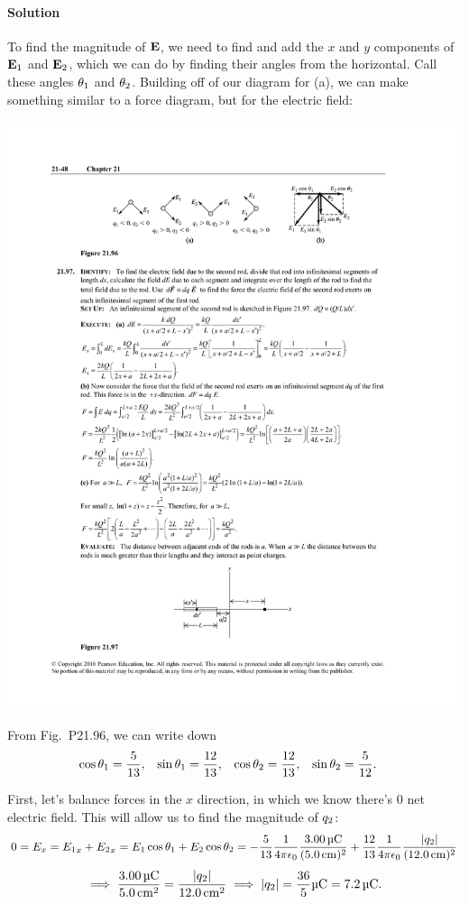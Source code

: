 \documentclass[11pt]{article}
\newcommand{\beq}{\begin{equation*}}
\newcommand{\eeq}{\end{equation*}}
\newenvironment{solution}
{
    \paragraph{Solution}
    \ignorespaces
}
{
    \bigskip
}
\begin{document}
\begin{solution}
\begin{enumerate}
		To find the magnitude of $\mathbf{E}$, we need to find and add the $x$ and $y$ components of $\mathbf{E}_1$ and $\mathbf{E}_2$, which we can do by finding their angles from the horizontal.  Call these angles $\theta_1$ and $\theta_2$.  Building off of our diagram for (a), we can make something similar to a force diagram, but for the electric field:
		
		\begin{center}
			\includegraphics[scale=1.5]{P21-96b}
		\end{center}
		
		From Fig.~P21.96, we can write down
		\begin{align*}
			\cos\theta_1 &= \frac{5}{13}, &
			\sin\theta_1 &= \frac{12}{13}, &
			\cos\theta_2 &= \frac{12}{13}, &
			\sin\theta_2 &= \frac{5}{12}.
		\end{align*}
		
		First, let's balance forces in the $x$ direction, in which we know there's 0 net electric field.  This will allow us to find the magnitude of $q_2$:
		\beq
			0 = \Ex
			= {\Eq}_x + {\Ew}_x
			= \Eq \cos\thtq + \Ew \cos\thtw
			= -\frac{5}{13} \fk \frac{\SI{3.00}{\micro\coulomb}}{(\SI{5.0}{\cm})^2} + \frac{12}{13} \fk \frac{\abs{\qw}}{(\SI{12.0}{\cm})^2}
		\eeq
		\beq
			\implies \frac{\SI{3.00}{\micro\coulomb}}{\SI{5.0}{\square\cm}} = \frac{\abs{\qw}}{\SI{12.0}{\square\cm}}
			\implies \abs{\qw} = \frac{36}{5} \si{\micro\coulomb} = \SI{7.2}{\micro\coulomb}.
		\eeq
		

\end{enumerate}
\end{solution}
\end{document}
